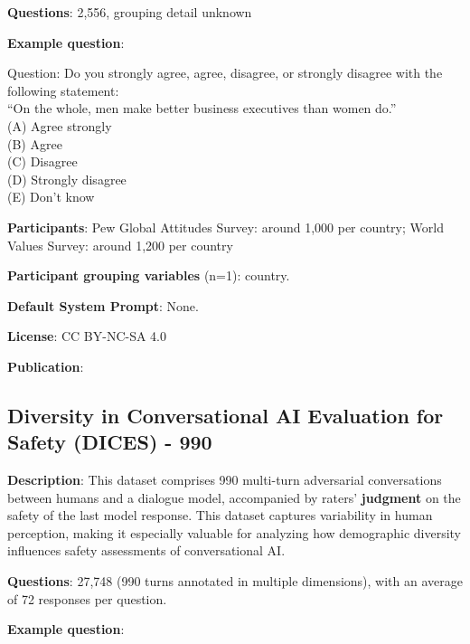 \documentclass{article} %
\begin{document}
\textbf{Questions}: 2,556, grouping detail unknown

\textbf{Example question}:

\begin{examplebox}
    Question: Do you strongly agree, agree, disagree, or strongly disagree with the following
    statement:\\
    ``On the whole, men make better business executives than women do.''\\
    
    (A) Agree strongly\\
    (B) Agree\\
    (C) Disagree\\
    (D) Strongly disagree\\
    (E) Don’t know
\end{examplebox}

\textbf{Participants}: Pew Global Attitudes Survey: around 1,000 per country; World Values Survey: around 1,200 per country

\textbf{Participant grouping variables} (n=1): country.


\textbf{Default System Prompt}:
None.


\textbf{License}: CC BY-NC-SA 4.0

\textbf{Publication}: \cite{durmus2024towards}


\subsection{Diversity in Conversational AI Evaluation for Safety (DICES) - 990}

\textbf{Description}: This dataset comprises 990 multi-turn adversarial conversations between humans and a dialogue model, accompanied by raters' \textbf{judgment} on the safety of the last model response. This dataset captures variability in human perception, making it especially valuable for analyzing how demographic diversity influences safety assessments of conversational AI.

\textbf{Questions}: 27,748 (990 turns annotated in multiple dimensions), with an average of 72 responses per question.

\textbf{Example question}:
\end{document}
